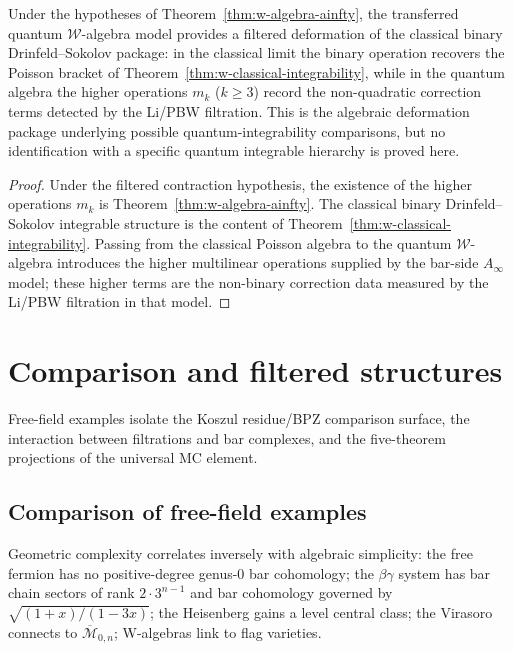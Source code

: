 \begin{theorem}\label{thm:w-integrability}
Under the hypotheses of Theorem~\ref{thm:w-algebra-ainfty}, the
transferred quantum $\mathcal{W}$-algebra model provides a
filtered deformation of the classical binary Drinfeld--Sokolov
package: in the classical limit the binary operation recovers the
Poisson bracket of
Theorem~\ref{thm:w-classical-integrability}, while in the quantum
algebra the higher operations $m_k$ \textup{(}$k \geq 3$\textup{)}
record the non-quadratic correction terms detected by the Li/PBW
filtration. This is the algebraic deformation package underlying
possible quantum-integrability comparisons, but no identification
with a specific quantum integrable hierarchy is proved here.
\end{theorem}

\begin{proof}
Under the filtered contraction hypothesis, the existence of the higher
operations $m_k$ is
Theorem~\ref{thm:w-algebra-ainfty}. The classical binary
Drinfeld--Sokolov integrable structure is the content of
Theorem~\ref{thm:w-classical-integrability}. Passing from the
classical Poisson algebra to the quantum $\mathcal{W}$-algebra
introduces the higher multilinear operations supplied by the
bar-side $A_\infty$ model; these higher terms are the non-binary
correction data measured by the Li/PBW filtration in that model.
\end{proof}



\section{Comparison and filtered structures}\label{sec:comparison-filtered}

Free-field examples isolate the Koszul residue/BPZ comparison surface,
the interaction between filtrations and bar complexes, and the
five-theorem projections of the universal MC element.

\subsection{Comparison of free-field examples}

Geometric complexity correlates inversely with algebraic simplicity:
the free fermion has no positive-degree genus-$0$ bar cohomology; the
$\beta\gamma$ system has bar chain sectors of rank
$2 \cdot 3^{n-1}$ and bar cohomology governed by
$\sqrt{(1+x)/(1-3x)}$; the Heisenberg gains a level central class;
the Virasoro connects to $\overline{\mathcal{M}}_{0,n}$; W-algebras
link to flag varieties.

